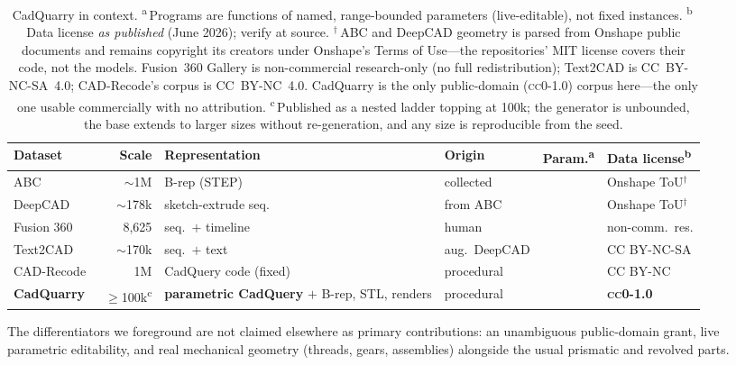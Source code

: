 \documentclass[11pt]{article}
\newcommand{\cc}{\textsc{cc0-1.0}}
\begin{document}
\begin{table}[h]
\centering\small\setlength{\tabcolsep}{5pt}
\renewcommand{\arraystretch}{1.2}
\newcommand{\yes}{\textcolor{good}{\ding{51}}}
\newcommand{\no}{\textcolor{rule!60!ink}{\ding{55}}}
\begin{tabularx}{\linewidth}{@{}l r >{\raggedright\arraybackslash}X l c l@{}}
\toprule
\textbf{Dataset} & \textbf{Scale} & \textbf{Representation} & \textbf{Origin}
 & \textbf{Param.\textsuperscript{a}} & \textbf{Data license\textsuperscript{b}}\\
\midrule
ABC~\cite{abc}            & $\sim$1M   & B-rep (STEP)              & collected   & \no & Onshape ToU$^{\dagger}$\\
DeepCAD~\cite{deepcad}    & $\sim$178k & sketch-extrude seq.       & from ABC    & \no & Onshape ToU$^{\dagger}$\\
Fusion 360~\cite{fusion360}& 8{,}625   & seq.\ $+$ timeline         & human       & \no & non-comm.\ res.\\
Text2CAD~\cite{text2cad}  & $\sim$170k & seq.\ $+$ text             & aug.\ DeepCAD& \no & CC BY-NC-SA\\
CAD-Recode~\cite{cadrecode}& 1M        & CadQuery code (fixed)     & procedural  & \no & CC BY-NC\\
\rowcolor{panel}\textbf{CadQuarry} & $\geq$100k\textsuperscript{c} & \textbf{parametric CadQuery} $+$ B-rep, STL, renders & procedural & \yes & \textbf{\cc{}}\\
\bottomrule
\end{tabularx}
\caption{CadQuarry in context. \textsuperscript{a}\,Programs are functions of
named, range-bounded parameters (live-editable), not fixed instances.
\textsuperscript{b}\,Data license \emph{as published} (June 2026); verify at
source. $^{\dagger}$\,ABC and DeepCAD geometry is parsed from Onshape public
documents and remains copyright its creators under Onshape's Terms of Use---the
repositories' MIT license covers their code, not the models. Fusion~360 Gallery
is non-commercial research-only (no full redistribution); Text2CAD is
CC~BY-NC-SA~4.0; CAD-Recode's corpus is CC~BY-NC~4.0. CadQuarry is the only
public-domain (\cc{}) corpus here---the only one usable commercially with no
attribution. \textsuperscript{c}\,Published as a nested ladder topping at 100k;
the generator is unbounded, the base extends to larger sizes without
re-generation, and any size is reproducible from the seed.}
\label{tab:compare}
\end{table}

\noindent The differentiators we foreground are not claimed elsewhere as primary
contributions: an unambiguous public-domain grant, live parametric editability,
and real mechanical geometry (threads, gears, assemblies) alongside the usual
prismatic and revolved parts.
\end{document}
